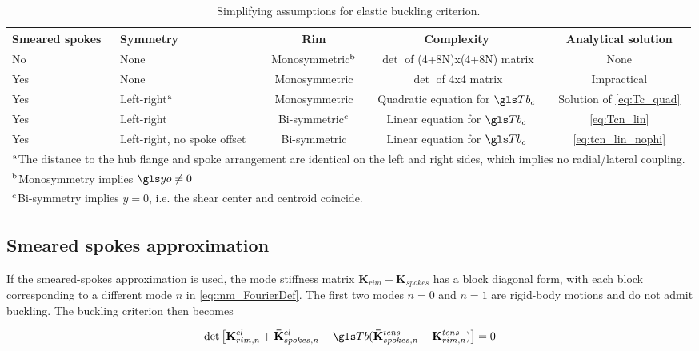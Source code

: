 \documentclass[\rootdir/thesis.tex]{subfiles}
\begin{document}
\begin{table}[h]
\caption{Simplifying assumptions for elastic buckling criterion.}
\label{tab:BucklingSolutions}
\begin{tabularx}{\textwidth}{p{1.2cm}Xccc}
\toprule
\centering Smeared spokes & \centering Symmetry & Rim & Complexity & Analytical solution\\
\midrule
\centering No  & \centering None & Monosymmetric$^{\rm b}$ & $\det$ of (4+8N)x(4+8N) matrix & None\\
\centering Yes & \centering None & Monosymmetric & $\det$ of 4x4 matrix & Impractical\\
\centering Yes & \centering Left-right$^{\rm a}$& Monosymmetric& Quadratic equation for $\Tb_c$ & Solution of \eqref{eq:Tc_quad}\\
\centering Yes & \centering Left-right& Bi-symmetric$^{\rm c}$ & Linear equation for $\Tb_c$ & \eqref{eq:Tcn_lin}\\
\centering Yes & \centering Left-right, no spoke offset & Bi-symmetric & Linear equation for $\Tb_c$ & \eqref{eq:tcn_lin_nophi}\\
\bottomrule
\multicolumn{5}{p{\textwidth}}{
$^{\rm a}$The distance to the hub flange and spoke arrangement are identical on the left and right sides, which implies no radial/lateral coupling.
}\\
\multicolumn{5}{p{\textwidth}}{
$^{\rm b}$Monosymmetry implies $\yo\neq 0$
}\\
\multicolumn{5}{p{\textwidth}}{
$^{\rm c}$Bi-symmetry implies $y=0$, i.e. the shear center and centroid coincide.
}\\
\bottomrule
\end{tabularx}
\end{table}

\subsection{Smeared spokes approximation}

If the smeared-spokes approximation is used, the mode stiffness matrix $\mathbf{K}_{rim} + \mathbf{\bar{K}}_{spokes}$ has a block diagonal form, with each block corresponding to a different mode $n$ in \eqref{eq:mm_FourierDef}. The first two modes $n=0$ and $n=1$ are rigid-body motions and do not admit buckling. The buckling criterion then becomes

\begin{equation}
\label{eq:Tc_crit_smeared}
\det{\left[\mathbf{K}_{rim,n}^{el} + \mathbf{\bar{K}}_{spokes,n}^{el} + \Tb(\mathbf{\bar{K}}_{spokes,n}^{tens} - \mathbf{K}_{rim,n}^{tens})\right]} = 0
\end{equation}
\end{document}
